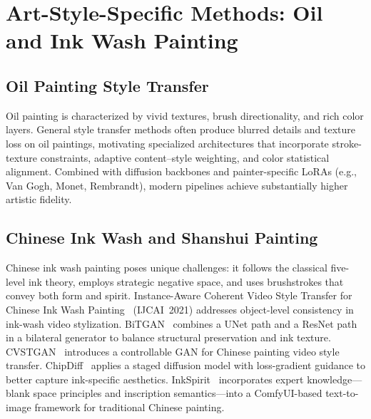 \section{Art-Style-Specific Methods: Oil and Ink Wash Painting}
\label{sec:artstyle}

\subsection{Oil Painting Style Transfer}

Oil painting is characterized by vivid textures, brush directionality, and rich color
layers. General style transfer methods often produce blurred details and texture loss on
oil paintings, motivating specialized architectures that incorporate stroke-texture
constraints, adaptive content--style weighting, and color statistical alignment.
Combined with diffusion backbones and painter-specific LoRAs (e.g., Van Gogh, Monet,
Rembrandt), modern pipelines achieve substantially higher artistic fidelity.

\subsection{Chinese Ink Wash and Shanshui Painting}

Chinese ink wash painting poses unique challenges: it follows the classical five-level
ink theory, employs strategic negative space, and uses brushstrokes that convey both
form and spirit. Instance-Aware Coherent Video Style Transfer for Chinese Ink Wash
Painting~\cite{liang2021instance} (IJCAI~2021) addresses object-level consistency in
ink-wash video stylization. BiTGAN~\cite{he2023bitgan} combines a UNet path and a ResNet
path in a bilateral generator to balance structural preservation and ink texture.
CVSTGAN~\cite{wang2024cvstgan} introduces a controllable GAN for Chinese painting video
style transfer. ChipDiff~\cite{liu2026chipdiff} applies a staged diffusion model with
loss-gradient guidance to better capture ink-specific aesthetics. InkSpirit~\cite{zhang2025inkspirit}
incorporates expert knowledge---blank space principles and inscription semantics---into a
ComfyUI-based text-to-image framework for traditional Chinese painting.
